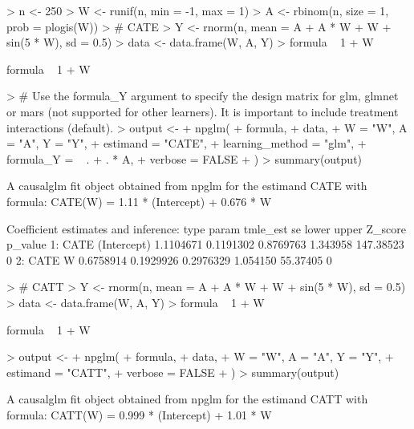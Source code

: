 \documentclass[article]{jss}
\begin{document}
\begin{Schunk}
\begin{Sinput}
> n <- 250
> W <- runif(n, min = -1, max = 1)
> A <- rbinom(n, size = 1, prob = plogis(W))
> # CATE
> Y <- rnorm(n, mean = A + A * W + W + sin(5 * W), sd = 0.5)
> data <- data.frame(W, A, Y)
> formula ~ 1 + W
\end{Sinput}
\begin{Soutput}
formula ~ 1 + W
\end{Soutput}
\begin{Sinput}
> # Use the formula_Y argument to specify the design matrix for glm, glmnet or mars (not supported for other learners). It is important to include treatment interactions (default).
> output <-
+   npglm(
+     formula,
+     data,
+     W = "W", A = "A", Y = "Y",
+     estimand = "CATE",
+     learning_method = "glm",
+     formula_Y = ~ . + . * A,
+     verbose = FALSE
+   )
> summary(output)
\end{Sinput}
\begin{Soutput}
A causalglm fit object obtained from npglm for the estimand CATE with formula: 
CATE(W) = 1.11 * (Intercept) + 0.676 * W

Coefficient estimates and inference:
   type       param  tmle_est        se     lower    upper   Z_score p_value
1: CATE (Intercept) 1.1104671 0.1191302 0.8769763 1.343958 147.38523       0
2: CATE           W 0.6758914 0.1929926 0.2976329 1.054150  55.37405       0
\end{Soutput}
\begin{Sinput}
> # CATT
> Y <- rnorm(n, mean = A + A * W + W + sin(5 * W), sd = 0.5)
> data <- data.frame(W, A, Y)
> formula ~ 1 + W
\end{Sinput}
\begin{Soutput}
formula ~ 1 + W
\end{Soutput}
\begin{Sinput}
> output <-
+   npglm(
+     formula,
+     data,
+     W = "W", A = "A", Y = "Y",
+     estimand = "CATT",
+     verbose = FALSE
+   )
> summary(output)
\end{Sinput}
\begin{Soutput}
A causalglm fit object obtained from npglm for the estimand CATT with formula: 
CATT(W) = 0.999 * (Intercept) + 1.01 * W


\end{Soutput}
\end{Schunk}
\end{document}
